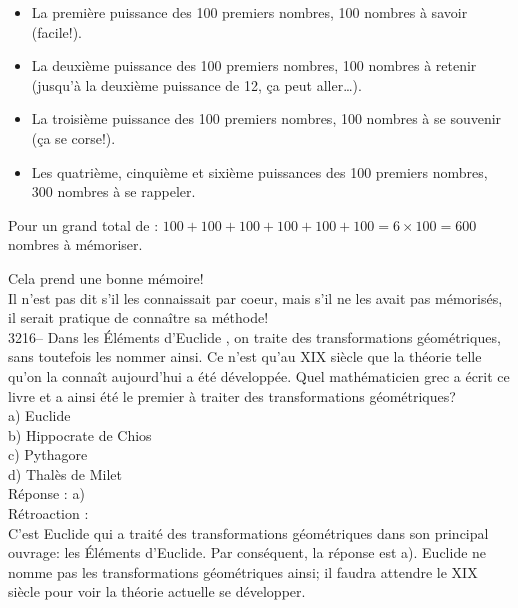 \documentclass[letterpaper, 12pt]{article}
\begin{document}
\begin{itemize}
\item La premi\`ere puissance des 100 premiers nombres, 100 nombres \`a savoir (facile!).
\item La deuxi\`eme puissance des 100 premiers nombres, 100 nombres \`a retenir (jusqu'\`a la deuxi\`eme puissance de 12, \c ca peut aller\dots ).
\item La troisi\`eme puissance des 100 premiers nombres, 100 nombres \`a se souvenir (\c ca se corse!).
\item Les quatri\`eme, cinqui\`eme et sixi\`eme puissances des 100 premiers nombres, 300 nombres \`a se rappeler.
\end{itemize}
\begin{center}
Pour un grand total de : $100 + 100 + 100 + 100 + 100 + 100 = 6 \times 100 = 600$ nombres \`a m\'emoriser.
\end{center}
Cela prend une bonne m\'emoire!\\
Il n'est pas dit s'il les connaissait par coeur, mais s'il ne les avait pas m\'emoris\'es, il serait pratique de conna\^itre sa m\'ethode!\\



3216-- Dans \og les \'El\'ements d'Euclide \fg, on traite des transformations g\'eom\'etriques, sans toutefois les nommer ainsi. Ce n'est qu'au {\scriptsize XIX\ieme{}} si\`ecle que la th\'eorie telle qu'on la conna\^it aujourd'hui a \'et\'e d\'evelopp\'ee. Quel math\'ematicien grec a \'ecrit ce livre et a ainsi \'et\'e le premier \`a traiter des transformations g\'eom\'etriques?\\

a) Euclide\\
b) Hippocrate de Chios\\
c) Pythagore\\
d) Thal\`es de Milet\\

R\'eponse : a)\\

R\'etroaction :\\
C'est Euclide qui a trait\'e des transformations g\'eom\'etriques dans son principal ouvrage: \og les \'El\'ements d'Euclide\fg. Par cons\'equent, la r\'eponse est a). Euclide ne nomme pas les transformations g\'eom\'etriques ainsi; il faudra attendre le {\scriptsize XIX\ieme{}} si\`ecle pour voir la th\'eorie actuelle se d\'evelopper.\\
\end{document}
